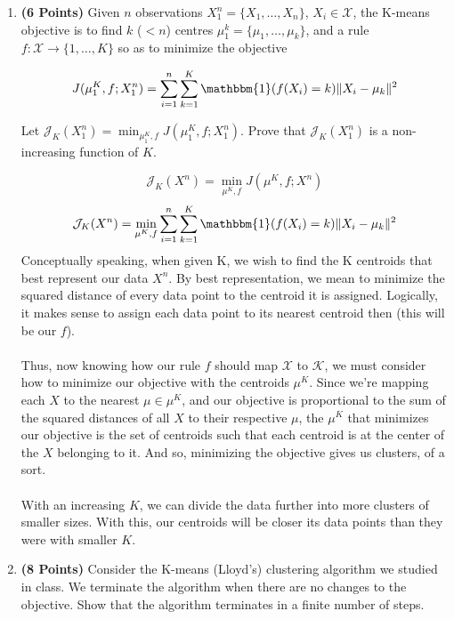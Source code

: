 \documentclass[a4paper]{article}
\newcounter{thm}
\newcommand{\Xcal}{\mathcal{X}}
\newcommand{\Jcal}{\mathcal{J}}
\newcommand{\indfone}{\mathbbm{1}}
\theoremstyle{definition}
\newenvironment{soln}{
	\leavevmode\color{blue}\ignorespaces
}{}
\begin{document}
\begin{enumerate}

\item \textbf{(6 Points)}
Given $n$ observations $X_1^n = \{X_1, \dots, X_n\}$, $X_i \in \Xcal$, the K-means objective
is to find $k$
($<n$) centres $\mu_1^k = \{\mu_1, \dots, \mu_k\}$, and a rule $f:\Xcal \rightarrow
\{1,\dots, K\}$ so as to minimize the objective

\begin{equation}
J(\mu_1^K, f; X_1^n) = \sum_{i=1}^n \sum_{k=1}^K \indfone(f(X_i) = k) \|X_i - \mu_k\|^2
\label{eqn:kmeans}
\end{equation}

Let $\Jcal_K(X_1^n) = \min_{\mu_1^K, f} J(\mu_1^K, f; X_1^n)$. Prove that
$\Jcal_{K}(X_1^n)$ is a non-increasing function of $K$.

\begin{soln}
	$$\Jcal_K(X^n) = \min_{\mu^K, f} J(\mu^K, f; X^n)$$
	$$\Jcal_K(X^n) = \min_{\mu^K, f} \sum_{i=1}^n \sum_{k=1}^K \indfone(f(X_i) = k) \|X_i - \mu_k\|^2$$
	Conceptually speaking, when given K, we wish to find the K centroids that best represent our data $X^n$. By best representation, we mean to minimize the squared distance of every data point to the centroid it is assigned. Logically, it makes sense to assign each data point to its nearest centroid then (this will be our $f$). \\ \\
	Thus, now knowing how our rule $f$ should map $\Xcal$ to $\mathcal{K}$, we must consider how to minimize our objective with the centroids $\mu^K$. Since we're mapping each $X$ to the nearest $\mu \in \mu^K$, and our objective is proportional to the sum of the squared distances of all $X$ to their respective $\mu$, the $\mu^K$ that minimizes our objective is the set of centroids such that each centroid is at the center of the $X$ belonging to it. And so, minimizing the objective gives us clusters, of a sort. \\ \\
	With an increasing $K$, we can divide the data further into more clusters of smaller sizes. With this, our centroids will be closer its data points than they were with smaller $K$.
\end{soln}

\item \textbf{(8 Points)}
Consider the K-means (Lloyd's) clustering algorithm we studied in class. We
terminate the algorithm when there are no changes to the objective.
Show that the algorithm terminates in a finite number of steps.

\end{enumerate}
\end{document}
